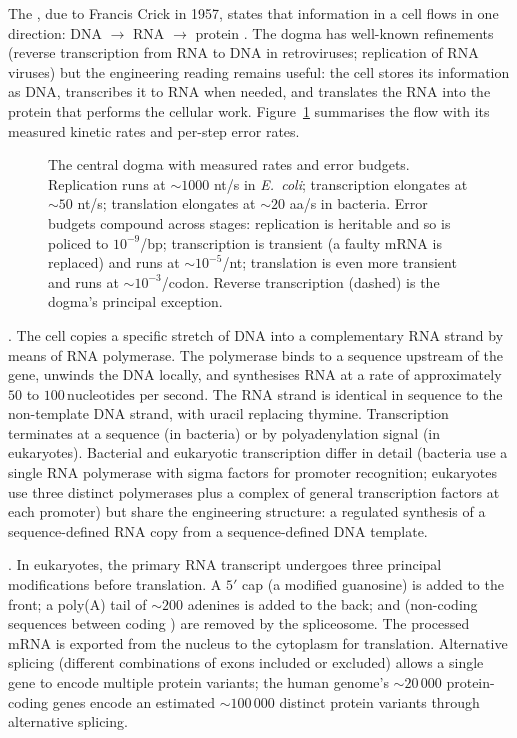 The , due to Francis Crick in 1957, states
that information in a cell flows in one direction: DNA $\rightarrow$
RNA $\rightarrow$ protein \cite{paper:v6c03-crick-1958}. The dogma has
well-known refinements (reverse transcription from RNA to DNA in
retroviruses; replication of RNA viruses) but the engineering reading
remains useful: the cell stores its information as DNA, transcribes it
to RNA when needed, and translates the RNA into the protein that
performs the cellular work. Figure~\ref{fig:central-dogma} summarises
the flow with its measured kinetic rates and per-step error rates.

\begin{figure}[h]
\centering

\caption{The central dogma with measured rates and error budgets.
Replication runs at $\sim 1000$ nt/s in \emph{E.~coli}; transcription
elongates at $\sim 50$ nt/s; translation elongates at $\sim 20$ aa/s
in bacteria. Error budgets compound across stages: replication is
heritable and so is policed to $10^{-9}$/bp; transcription is
transient (a faulty mRNA is replaced) and runs at $\sim 10^{-5}$/nt;
translation is even more transient and runs at $\sim 10^{-3}$/codon.
Reverse transcription (dashed) is the dogma's principal exception.}
\label{fig:central-dogma}
\end{figure}

. The cell copies a specific stretch of DNA
into a complementary RNA strand by means of RNA polymerase. The
polymerase binds to a  sequence upstream of the
gene, unwinds the DNA locally, and synthesises RNA at a rate of
approximately $50$ to $100\,\text{nucleotides per second}$. The RNA
strand is identical in sequence to the non-template DNA strand, with
uracil replacing thymine. Transcription terminates at a
 sequence (in bacteria) or by polyadenylation
signal (in eukaryotes). Bacterial and eukaryotic transcription differ
in detail (bacteria use a single RNA polymerase with sigma factors
for promoter recognition; eukaryotes use three distinct polymerases
plus a complex of general transcription factors at each promoter) but
share the engineering structure: a regulated synthesis of a
sequence-defined RNA copy from a sequence-defined DNA template.

. In eukaryotes, the primary RNA transcript
undergoes three principal modifications before translation. A
$5'$ cap (a modified guanosine) is added to the front; a poly(A) tail
of $\sim 200$ adenines is added to the back; and 
(non-coding sequences between coding ) are removed by
the spliceosome. The processed mRNA is exported from the nucleus to
the cytoplasm for translation. Alternative splicing (different
combinations of exons included or excluded) allows a single gene to
encode multiple protein variants; the human genome's
$\sim 20\,000$ protein-coding genes encode an estimated $\sim 100\,000$
distinct protein variants through alternative splicing.

